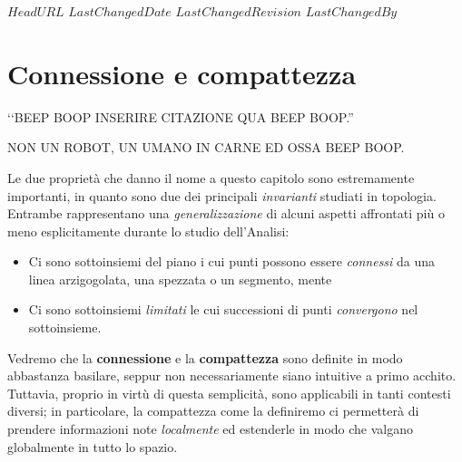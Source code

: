 \svnidlong
{$HeadURL$}
{$LastChangedDate$}
{$LastChangedRevision$}
{$LastChangedBy$}

\chapter{Connessione e compattezza}

\begin{introduction}
‘‘BEEP BOOP INSERIRE CITAZIONE QUA BEEP BOOP.''
\begin{flushright}
	\textsc{NON UN ROBOT,} UN UMANO IN CARNE ED OSSA BEEP BOOP.
\end{flushright}
\end{introduction}
\noindent Le due proprietà che danno il nome a questo capitolo sono estremamente importanti, in quanto sono due dei principali \textit{invarianti} studiati in topologia. Entrambe rappresentano una \textit{generalizzazione} di alcuni aspetti affrontati più o meno esplicitamente durante lo studio dell'Analisi:
\begin{itemize}
	\item Ci sono sottoinsiemi del piano i cui punti possono essere \textit{connessi} da una linea arzigogolata, una spezzata o un segmento, mente
	\item Ci sono sottoinsiemi \textit{limitati} le cui successioni di punti \textit{convergono} nel sottoinsieme.
\end{itemize}
Vedremo che la \textbf{connessione} e la \textbf{compattezza} sono definite in modo abbastanza basilare, seppur non necessariamente siano intuitive a primo acchito. Tuttavia, proprio in virtù di questa semplicità, sono applicabili in tanti contesti diversi; in particolare, la compattezza come la definiremo ci permetterà di prendere informazioni note \textit{localmente} ed estenderle in modo che valgano globalmente in tutto lo spazio.
